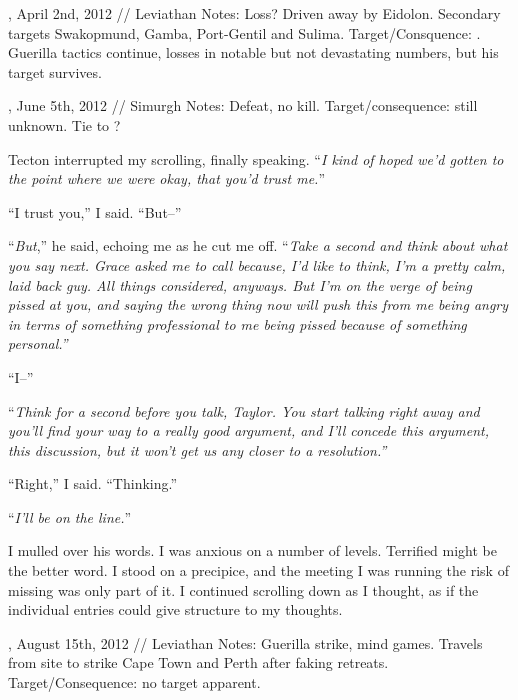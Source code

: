 , April 2nd, 2012 // Leviathan
Notes:  Loss?  Driven away by Eidolon.  Secondary targets Swakopmund, Gamba, Port-Gentil and Sulima.
Target/Consquence: \underline{}.  Guerilla tactics continue, losses in notable but not devastating numbers, but his target survives.



, June 5th, 2012 // Simurgh
Notes: Defeat, no kill.
Target/consequence: still unknown.  Tie to \underline{}\underline{\strong{ }}?



Tecton interrupted my scrolling, finally speaking.  ``\emph{I kind of hoped we'd gotten to the point where we were okay, that you'd trust me.}''



``I trust you,'' I said.  ``But--''



``\emph{But},'' he said, echoing me as he cut me off.  ``\emph{Take a second and think about what you say next.  Grace asked me to call because, I'd like to think, I'm a pretty calm, laid back guy.  All things considered, anyways.  But I'm on the verge of being pissed at you, and saying the wrong thing now will push this from me being angry in terms of something professional to me being pissed because of something personal.''}



``I--''



``\emph{Think for a second before you talk, Taylor.  You start talking right away and you'll find your way to a really good argument, and I'll concede this argument, this discussion, but it won't get us any closer to a resolution.''}



``Right,'' I said.  ``Thinking.''



``\emph{I'll be on the line.}''



I mulled over his words.  I was anxious on a number of levels.  Terrified might be the better word.  I stood on a precipice, and the meeting I was running the risk of missing was only part of it.  I continued scrolling down as I thought, as if the individual entries could give structure to my thoughts.



, August 15th, 2012 // Leviathan
Notes: Guerilla strike, mind games.  Travels from site to strike Cape Town and Perth after faking retreats.
Target/Consequence: no target apparent.



